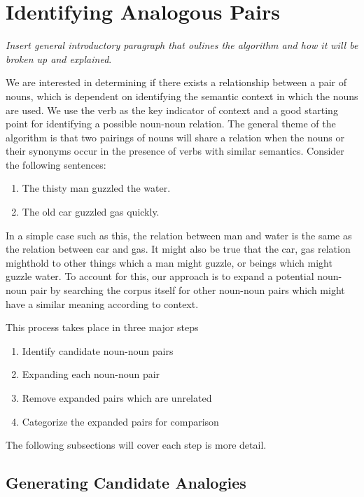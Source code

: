 \documentclass[11pt]{article}
\begin{document}
\section{Identifying Analogous Pairs}
\label{sec:indetifying}

\emph{Insert general introductory paragraph that oulines the algorithm and how
  it will be broken up and explained}.

We are interested in determining if there exists a relationship between a pair
of nouns, which is dependent on identifying the semantic context in which the
nouns are used.  We use the verb as the key indicator of context and a good
starting point for identifying a possible noun-noun relation.  The general theme
of the algorithm is that two pairings of nouns will share a relation when the
nouns or their synonyms occur in the presence of verbs with similar semantics.
Consider the following sentences:
\begin{enumerate}
  \item The thisty man guzzled the water.
  \item The old car guzzled gas quickly.
\end{enumerate}

In a simple case such as this, the relation between man and water is the same as
the relation between car and gas.  It might also be true that the car, gas
relation mighthold to other things which a man might guzzle, or beings which
might guzzle water.  To account for this, our approach is to expand a potential
noun-noun pair by searching the corpus itself for other noun-noun pairs which
might have a similar meaning according to context.

This process takes place in three major steps
\begin{enumerate}
  \item Identify candidate noun-noun pairs
  \item Expanding each noun-noun pair
  \item Remove expanded pairs which are unrelated
  \item Categorize the expanded pairs for comparison
\end{enumerate}

The following subsections will cover each step is more detail.

\subsection{Generating Candidate Analogies}
\end{document}

